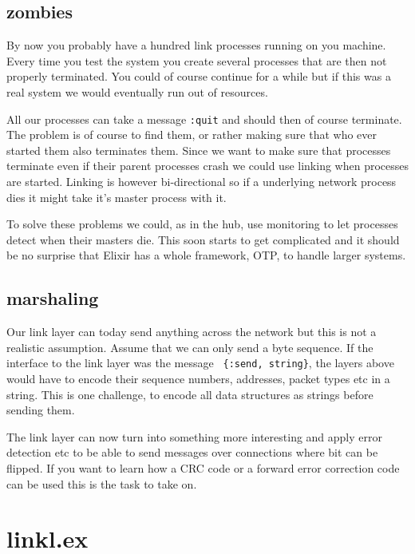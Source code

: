 \documentclass[a4paper,11pt]{article}
\begin{document}
\subsection{zombies}

By now you probably have a hundred link processes running on you
machine. Every time you test the system you create several processes
that are then not properly terminated. You could of course continue
for a while but if this was a real system we would eventually run out
of resources.

All our processes can take a message {\tt :quit} and should then of
course terminate. The problem is of course to find them, or rather
making sure that who ever started them also terminates them. Since we
want to make sure that processes terminate even if their parent
processes crash we could use linking when processes are
started. Linking is however bi-directional so if a underlying network
process dies it might take it's master process with it.

To solve these problems we could, as in the hub, use monitoring to let
processes detect when their masters die. This soon starts to get
complicated and it should be no surprise that Elixir has a whole
framework, OTP, to handle larger systems.

\subsection{marshaling}

Our link layer can today send anything across the network but this is
not a realistic assumption. Assume that we can only send a byte
sequence. If the interface to the link layer was the message {\tt
  \{:send, string\}}, the layers above would have to encode their
sequence numbers, addresses, packet types etc in a string. This is one
challenge, to encode all data structures as strings before sending
them.

The link layer can now turn into something more interesting and apply
error detection etc to be able to send messages over connections
where bit can be flipped. If you want to learn how a CRC code or a
forward error correction code can be used this is the task to take on.



\newpage
\appendix
\section{linkl.ex} \label{app:link}

\pagebreak
\end{document}
